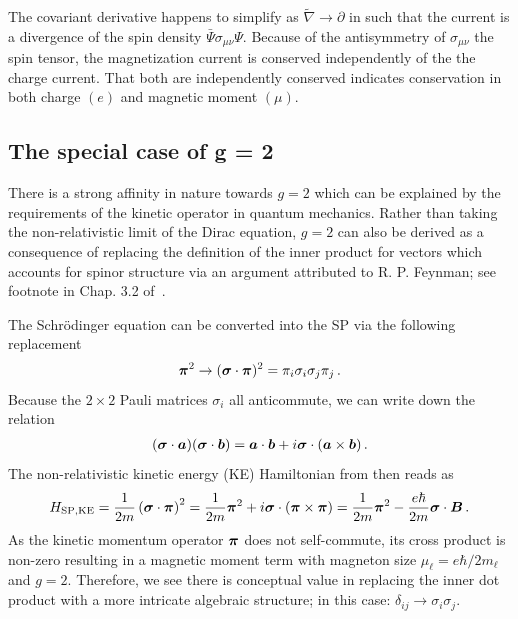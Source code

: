 The covariant derivative happens to simplify as $\widetilde\nabla\rightarrow\partial$ in  such that the current is a divergence of the spin density $\bar\Psi\sigma_{\mu\nu}\Psi$. Because of the antisymmetry of $\sigma_{\mu\nu}$ the spin tensor, the magnetization current is conserved independently of the the charge current. That both are independently conserved indicates conservation in both charge $(e)$ and magnetic moment $(\mu)$.

\subsection{The special case of g = 2}
\label{sec:unique}
There is a strong affinity in nature towards $g\!=\!2$ which can be explained by the requirements of the kinetic operator in quantum mechanics. Rather than taking the non-relativistic limit of the Dirac equation, $g\!=\!2$ can also be derived as a consequence of replacing the definition of the inner product for vectors which accounts for spinor structure via an argument attributed to R. P. Feynman; see footnote in Chap. 3.2 of~\cite{sakurai1967advanced}.

The Schr{\"o}dinger equation can be converted into the SP  via the following replacement
\begin{alignat}{1}
	\label{nat:0}
    \boldsymbol{\pi}^{2}\rightarrow(\boldsymbol{\sigma}\cdot\boldsymbol{\pi})^{2}=\pi_{i}\sigma_{i}\sigma_{j}\pi_{j}\,.
\end{alignat}
Because the $2\times2$ Pauli matrices $\sigma_{i}$ all anticommute, we can write down the relation
\begin{alignat}{1}
	\label{nat:1}
    (\boldsymbol{\sigma}\cdot\boldsymbol{a})(\boldsymbol{\sigma}\cdot\boldsymbol{b})=\boldsymbol{a}\cdot\boldsymbol{b}+i\boldsymbol{\sigma}\cdot(\boldsymbol{a}\times\boldsymbol{b})\,.
\end{alignat}
The non-relativistic kinetic energy (KE) Hamiltonian from  then reads as
\begin{align}
	\label{nat:2}
    {H}_{\mathrm{SP,KE}}=\frac{1}{2m}\left(\boldsymbol{\sigma}\cdot\boldsymbol{\pi}\right)^{2}=\frac{1}{2m}\boldsymbol{\pi}^{2}+i\boldsymbol{\sigma}\cdot(\boldsymbol{\pi}\times\boldsymbol{\pi})=\frac{1}{2m}\boldsymbol{\pi}^{2}-\frac{e\hbar}{2m}\boldsymbol{\sigma}\cdot\boldsymbol{B}\,.
\end{align}
As the kinetic momentum operator $\boldsymbol{\pi}$ does not self-commute, its cross product is non-zero resulting in a magnetic moment term with magneton size $\mu_{\ell}=e\hbar/2m_{\ell}$ and $g\!=\!2$. Therefore, we see there is conceptual value in replacing the inner dot product with a more intricate algebraic structure; in this case: $\delta_{ij}\rightarrow\sigma_{i}\sigma_{j}$.

